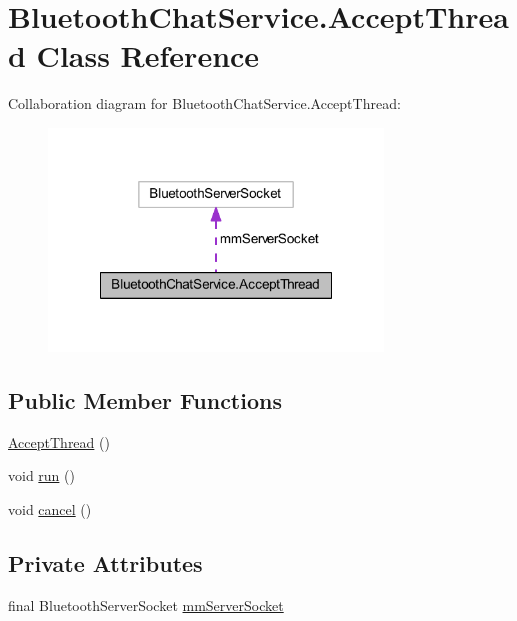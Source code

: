\hypertarget{classcom_1_1example_1_1android_1_1_bluetooth_chat_1_1_bluetooth_chat_service_1_1_accept_thread}{\section{Bluetooth\-Chat\-Service.\-Accept\-Thread Class Reference}
\label{classcom_1_1example_1_1android_1_1_bluetooth_chat_1_1_bluetooth_chat_service_1_1_accept_thread}
}


Collaboration diagram for Bluetooth\-Chat\-Service.\-Accept\-Thread\-:
\nopagebreak
\begin{figure}[H]
\begin{center}
\leavevmode
\includegraphics[width=252pt]{classcom_1_1example_1_1android_1_1_bluetooth_chat_1_1_bluetooth_chat_service_1_1_accept_thread__coll__graph}
\end{center}
\end{figure}
\subsection*{Public Member Functions}
\begin{DoxyCompactItemize}
\item 
\hyperlink{classcom_1_1example_1_1android_1_1_bluetooth_chat_1_1_bluetooth_chat_service_1_1_accept_thread_a87e04948833d0fd4826daa3f527b2153}{Accept\-Thread} ()
\item 
void \hyperlink{classcom_1_1example_1_1android_1_1_bluetooth_chat_1_1_bluetooth_chat_service_1_1_accept_thread_a13a43e6d814de94978c515cb084873b1}{run} ()
\item 
void \hyperlink{classcom_1_1example_1_1android_1_1_bluetooth_chat_1_1_bluetooth_chat_service_1_1_accept_thread_a02d5fa6b14e221f3012a794b905be166}{cancel} ()
\end{DoxyCompactItemize}
\subsection*{Private Attributes}
\begin{DoxyCompactItemize}
\item 
final Bluetooth\-Server\-Socket \hyperlink{classcom_1_1example_1_1android_1_1_bluetooth_chat_1_1_bluetooth_chat_service_1_1_accept_thread_a0b04e3279c0cd8ff1bc19ab19c7539d9}{mm\-Server\-Socket}
\end{DoxyCompactItemize}


